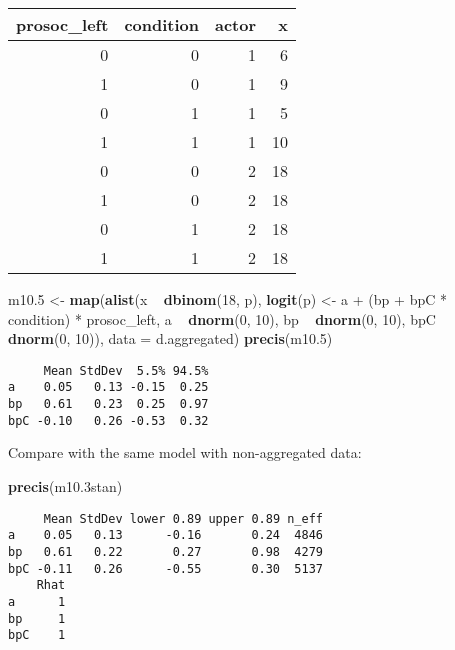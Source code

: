 \documentclass[]{tufte-handout}
\newenvironment{Shaded}{}{}
\newcommand{\KeywordTok}[1]{\textcolor[rgb]{0.00,0.44,0.13}{\textbf{#1}}}
\newcommand{\DataTypeTok}[1]{\textcolor[rgb]{0.56,0.13,0.00}{#1}}
\newcommand{\DecValTok}[1]{\textcolor[rgb]{0.25,0.63,0.44}{#1}}
\newcommand{\FloatTok}[1]{\textcolor[rgb]{0.25,0.63,0.44}{#1}}
\newcommand{\StringTok}[1]{\textcolor[rgb]{0.25,0.44,0.63}{#1}}
\newcommand{\OperatorTok}[1]{\textcolor[rgb]{0.40,0.40,0.40}{#1}}
\newcommand{\NormalTok}[1]{#1}
\begin{document}
\begin{longtable}[]{@{}rrrr@{}}
\toprule
prosoc\_left & condition & actor & x\tabularnewline
\midrule
\endhead
0 & 0 & 1 & 6\tabularnewline
1 & 0 & 1 & 9\tabularnewline
0 & 1 & 1 & 5\tabularnewline
1 & 1 & 1 & 10\tabularnewline
0 & 0 & 2 & 18\tabularnewline
1 & 0 & 2 & 18\tabularnewline
0 & 1 & 2 & 18\tabularnewline
1 & 1 & 2 & 18\tabularnewline
\bottomrule
\end{longtable}

\begin{Shaded}
\begin{Highlighting}[]
\NormalTok{m10}\FloatTok{.5}\NormalTok{ <-}\StringTok{ }\KeywordTok{map}\NormalTok{(}\KeywordTok{alist}\NormalTok{(x }\OperatorTok{~}\StringTok{ }\KeywordTok{dbinom}\NormalTok{(}\DecValTok{18}\NormalTok{, p), }\KeywordTok{logit}\NormalTok{(p) <-}\StringTok{ }\NormalTok{a }\OperatorTok{+}\StringTok{ }
\StringTok{    }\NormalTok{(bp }\OperatorTok{+}\StringTok{ }\NormalTok{bpC }\OperatorTok{*}\StringTok{ }\NormalTok{condition) }\OperatorTok{*}\StringTok{ }\NormalTok{prosoc_left, a }\OperatorTok{~}\StringTok{ }
\StringTok{    }\KeywordTok{dnorm}\NormalTok{(}\DecValTok{0}\NormalTok{, }\DecValTok{10}\NormalTok{), bp }\OperatorTok{~}\StringTok{ }\KeywordTok{dnorm}\NormalTok{(}\DecValTok{0}\NormalTok{, }\DecValTok{10}\NormalTok{), bpC }\OperatorTok{~}\StringTok{ }\KeywordTok{dnorm}\NormalTok{(}\DecValTok{0}\NormalTok{, }
    \DecValTok{10}\NormalTok{)), }\DataTypeTok{data =}\NormalTok{ d.aggregated)}
\KeywordTok{precis}\NormalTok{(m10}\FloatTok{.5}\NormalTok{)}
\end{Highlighting}
\end{Shaded}

\begin{verbatim}
     Mean StdDev  5.5% 94.5%
a    0.05   0.13 -0.15  0.25
bp   0.61   0.23  0.25  0.97
bpC -0.10   0.26 -0.53  0.32
\end{verbatim}

Compare with the same model with non-aggregated data:

\begin{Shaded}
\begin{Highlighting}[]
\KeywordTok{precis}\NormalTok{(m10}\FloatTok{.3}\NormalTok{stan)}
\end{Highlighting}
\end{Shaded}

\begin{verbatim}
     Mean StdDev lower 0.89 upper 0.89 n_eff
a    0.05   0.13      -0.16       0.24  4846
bp   0.61   0.22       0.27       0.98  4279
bpC -0.11   0.26      -0.55       0.30  5137
    Rhat
a      1
bp     1
bpC    1
\end{verbatim}
\end{document}
